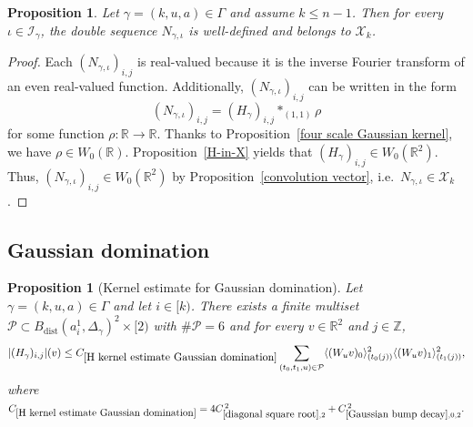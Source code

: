 \documentclass[12pt,reqno]{amsart}
\theoremstyle{plain}
\newtheorem{proposition}[theorem]{Proposition}
\numberwithin{equation}{section}
\theoremstyle{remark}
\newcommand{\uses}[1]{}
\newcommand{\usesdefs}[1]{}
\newcommand{\Z}{{\mathbb Z}}
\newcommand{\R}{{\mathbb R}}
\begin{document}
\begin{proposition}\label{auto:N-kernel-well-definedness}\uses{four scale Gaussian kernel,H-in-X,convolution vector}\usesdefs{auto:Wiener-space-definition,auto:convolution-along-vector-definition,geometric parameters,double sequence of 2D functions,H multiplier,L multiplier,N multiplier}
Let $\gamma=(k,u,a)\in \Gamma$ and assume $k\le n-1$. Then for every $\iota\in\mathcal{I}_{\gamma}$, the double sequence $N_{\gamma,\iota}$ is well-defined and belongs to $\mathcal{X}_k$.
\end{proposition}

\begin{proof}
Each $(N_{\gamma,\iota})_{i,j}$ is real-valued because it is the inverse Fourier transform of an even real-valued function.
Additionally, $(N_{\gamma,\iota})_{i,j}$ can be written in the form
\[
(N_{\gamma,\iota})_{i,j}=(H_\gamma)_{i,j} \ast_{(1,1)} \rho
\]
for some function $\rho: \R \to \R$.
Thanks to Proposition~\ref{four scale Gaussian kernel}, we have $\rho \in W_0(\R)$.  Proposition~\ref{H-in-X} yields that $(H_{\gamma})_{i,j} \in W_0(\R^2)$. Thus, $(N_{\gamma,\iota})_{i,j} \in W_0(\R^2)$ by Proposition~\ref{convolution vector}, i.e.\ $N_{\gamma,\iota} \in \mathcal{X}_k$.
\end{proof}


\subsection{Gaussian domination}

\begin{proposition}[Kernel estimate for Gaussian domination]\label{H kernel estimate Gaussian domination}\uses{Operations on spaced sequences,Properties of distance of sequences,diagonal square root,Gaussian bump decay}\usesdefs{gaussian,bracket bump,multiplicatively spaced monotone sequences,Distance of spaced sequences,closed balls in A,geometric parameters,auto:unitary-matrices-definition,2D Gaussians,auto:Gaussian-difference-kernel-definition,square root Gaussian difference,s multiplier,H multiplier}
Let $\gamma=(k,u,a)\in \Gamma$ and let $i\in [k)$.
There exists a finite multiset $\mathcal{P}\subset B_{\mathrm{dist}}(a_i^1,\Delta_\gamma)^2\times [2)$ with $\#\mathcal{P}= 6$ and for every $v\in \R^2$ and $j\in\Z$,
\begin{equation}\label{auto:H-kernel-Gaussian-domination}|(H_\gamma)_{i,j}|(v) \le C_{\ref{H kernel estimate Gaussian domination}} \sum_{(t_0,t_1,u)\in\mathcal{P}} \langle (W_u v)_0\rangle_{(t_0(j))}^2 \langle (W_u v)_1\rangle_{(t_1(j))}^2, \end{equation}
where
$C_{\ref{H kernel estimate Gaussian domination}}
=
4C_{\ref{diagonal square root},2}^{\,2}
+
C_{\ref{Gaussian bump decay},0,2}^{\,2}.$
\end{proposition}
\end{document}
